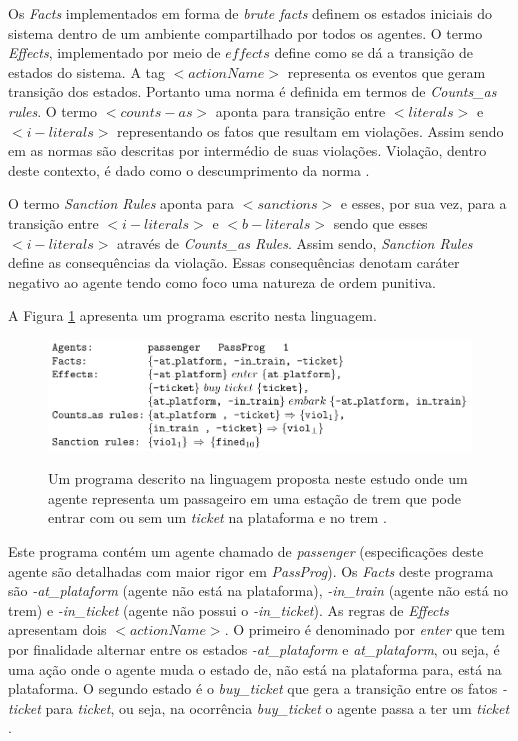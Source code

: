 Os \textit{Facts} implementados em forma de \textit{brute facts} definem os estados iniciais do sistema dentro de um ambiente compartilhado por todos os agentes. O termo \textit{Effects}, implementado por meio de $effects$ define como se dá a transição de estados do sistema. A tag $<actionName>$ representa os eventos que geram transição dos estados. Portanto uma norma é definida em termos de \textit{Counts\_as rules}. O termo $<counts-as>$ aponta para transição entre $<literals>$ e $<i-literals>$ representando os fatos que resultam em violações. Assim sendo em \cite{dastaniframework} as normas são descritas por intermédio de suas violações. Violação, dentro deste contexto, é dado como o descumprimento da norma \cite{ontologynormative}.

O termo \textit{Sanction Rules} aponta para $<sanctions>$ e esses, por sua vez, para a transição entre $<i-literals>$ e $<b-literals>$ sendo que esses $<i-literals>$ através de \textit{Counts\_as Rules}. Assim sendo, \textit{Sanction Rules} define as consequências da violação. Essas consequências denotam caráter negativo ao agente tendo como foco uma natureza de ordem punitiva.

A Figura \ref{exemploprograma} apresenta um programa escrito nesta linguagem. 

\begin{figure}[H]
  \centering
  \caption{Um programa descrito na linguagem proposta neste estudo onde um agente representa um passageiro em uma estação de trem que pode entrar com ou sem um \textit{ticket} na plataforma e no trem .}
  \includegraphics[width=0.8\linewidth]{figure/programdastani.png} 
  \begin{center}
  	\cite{dastaniframework}
  \end{center}
  \label{exemploprograma}
\end{figure}

Este programa contém um agente chamado de \textit{passenger} (especificações deste agente são detalhadas com maior rigor em \textit{PassProg}). Os \textit{Facts} deste programa são \textit{-at\_plataform} (agente não está na plataforma), \textit{-in\_train} (agente não está no trem) e \textit{-in\_ticket} (agente não possui o \textit{-in\_ticket}). As regras de \textit{Effects} apresentam dois $<actionName>$. O primeiro é denominado por \textit{enter} que tem por finalidade alternar entre os estados \textit{-at\_plataform} e \textit{at\_plataform}, 
ou seja, é uma ação onde o agente muda o estado de, não está na plataforma para, está na plataforma. O segundo estado é o \textit{buy\_ticket} que gera a transição entre os fatos \textit{-ticket} para \textit{ticket}, ou seja, na ocorrência \textit{buy\_ticket} o agente passa a ter um \textit{ticket} \cite{dastaniframework}.

